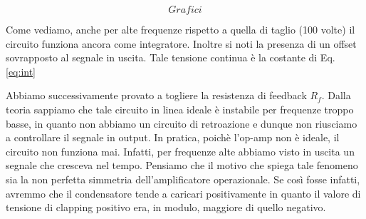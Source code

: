 $$Grafici$$

Come vediamo, anche per alte frequenze rispetto a quella di taglio (100 volte) il circuito funziona ancora come integratore. 
Inoltre si noti la presenza di un offset sovrapposto al segnale in uscita. Tale tensione continua è la costante di Eq. \eqref{eq:int}



Abbiamo successivamente provato a togliere la resistenza di feedback $R_f$.
Dalla teoria sappiamo che tale circuito in linea ideale è instabile per frequenze troppo basse, in quanto non abbiamo un circuito di retroazione e dunque non riusciamo a controllare il segnale in output.
In pratica, poichè l'op-amp non è ideale, il circuito non funziona mai.
Infatti, per frequenze alte abbiamo visto in uscita un segnale che cresceva nel tempo.
Pensiamo che il motivo che spiega tale fenomeno sia la non perfetta simmetria dell'amplificatore operazionale.
Se così fosse infatti, avremmo che il condensatore tende a caricari positivamente in quanto il valore di tensione di clapping positivo era, in modulo, maggiore di quello negativo.
